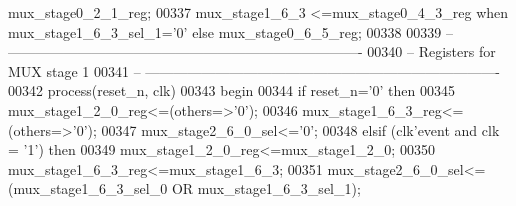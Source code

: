\begin{DoxyCode}
{      mux_stage0_2_1_reg};
00337 \textcolor{vhdlchar}{mux_stage1_6_3}  \textcolor{vhdlchar}{<=}\textcolor{vhdlchar}{mux_stage0_4_3_reg} \textcolor{keywordflow}{when} \textcolor{vhdlchar}{mux_stage1_6_3_sel_1}\textcolor{vhdlchar}{=}\textcolor{vhdlchar}{'}\textcolor{vhdllogic}{}\textcolor{vhdllogic}{0}\textcolor{vhdlchar}{'} \textcolor{keywordflow}{else} \textcolor{vhdlchar}{
      mux_stage0_6_5_reg};
00338 
00339 \textcolor{keyword}{-- ----------------------------------------------------------------------------}
00340 \textcolor{keyword}{-- Registers for MUX stage 1}
00341 \textcolor{keyword}{-- ----------------------------------------------------------------------------  }
00342   \textcolor{keywordflow}{process}(reset_n, clk)
00343 \textcolor{vhdlkeyword}{    begin}
00344       \textcolor{keywordflow}{if} \textcolor{vhdlchar}{reset_n}\textcolor{vhdlchar}{=}\textcolor{vhdlchar}{'}\textcolor{vhdllogic}{}\textcolor{vhdllogic}{0}\textcolor{vhdlchar}{'} \textcolor{keywordflow}{then}
00345             \textcolor{vhdlchar}{mux_stage1_2_0_reg}\textcolor{vhdlchar}{<=}\textcolor{vhdlchar}{(}\textcolor{keywordflow}{others}\textcolor{vhdlchar}{=}\textcolor{vhdlchar}{>}\textcolor{vhdlchar}{'}\textcolor{vhdllogic}{}\textcolor{vhdllogic}{0}\textcolor{vhdlchar}{'}\textcolor{vhdlchar}{)};
00346             \textcolor{vhdlchar}{mux_stage1_6_3_reg}\textcolor{vhdlchar}{<=}\textcolor{vhdlchar}{(}\textcolor{keywordflow}{others}\textcolor{vhdlchar}{=}\textcolor{vhdlchar}{>}\textcolor{vhdlchar}{'}\textcolor{vhdllogic}{}\textcolor{vhdllogic}{0}\textcolor{vhdlchar}{'}\textcolor{vhdlchar}{)};
00347          \textcolor{vhdlchar}{mux_stage2_6_0_sel}\textcolor{vhdlchar}{<=}\textcolor{vhdlchar}{'}\textcolor{vhdllogic}{}\textcolor{vhdllogic}{0}\textcolor{vhdlchar}{'};
00348       \textcolor{keywordflow}{elsif} \textcolor{vhdlchar}{(}\textcolor{vhdlchar}{clk}\textcolor{vhdlchar}{'}\textcolor{vhdlkeyword}{event} \textcolor{keywordflow}{and} \textcolor{vhdlchar}{clk} \textcolor{vhdlchar}{=} \textcolor{vhdlchar}{'}\textcolor{vhdllogic}{}\textcolor{vhdllogic}{1}\textcolor{vhdlchar}{'}\textcolor{vhdlchar}{)} \textcolor{keywordflow}{then}
00349             \textcolor{vhdlchar}{mux_stage1_2_0_reg}\textcolor{vhdlchar}{<=}\textcolor{vhdlchar}{mux_stage1_2_0};
00350             \textcolor{vhdlchar}{mux_stage1_6_3_reg}\textcolor{vhdlchar}{<=}\textcolor{vhdlchar}{mux_stage1_6_3};
00351          \textcolor{vhdlchar}{mux_stage2_6_0_sel}\textcolor{vhdlchar}{<=}\textcolor{vhdlchar}{(}\textcolor{vhdlchar}{mux_stage1_6_3_sel_0} \textcolor{keywordflow}{OR} \textcolor{vhdlchar}{mux_stage1_6_3_sel_1}\textcolor{vhdlchar}{)}; 

\end{DoxyCode}
